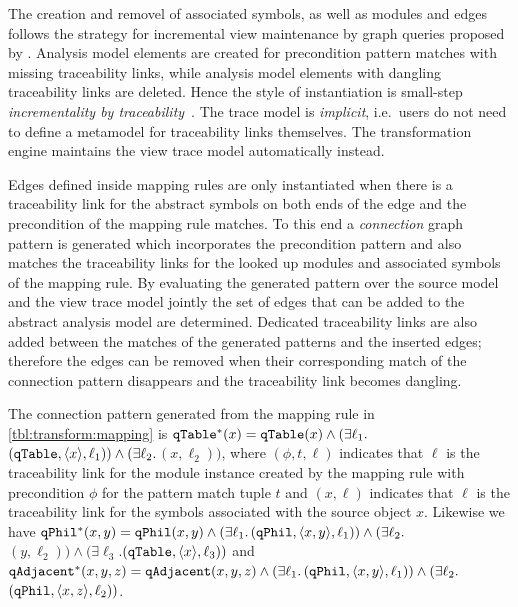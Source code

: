The creation and removel of associated symbols, as well as  modules and edges follows the strategy for incremental view maintenance by graph queries proposed by \citet{Debreceni14viewmodel}. Analysis model elements are created for precondition pattern matches with missing traceability links, while analysis model elements with dangling traceability links are deleted. Hence the style of instantiation is small-step \emph{incrementality by traceability}~\citep{Varro15styles}. The trace model is \emph{implicit}, i.e.~users do not need to define a metamodel for traceability links themselves. The transformation engine maintains the view trace model automatically instead.

Edges defined inside mapping rules are only instantiated when there is a traceability link for the abstract  symbols on both ends of the edge and the precondition of the mapping rule matches. To this end a \emph{connection} graph pattern is generated which incorporates the precondition pattern and  also matches the traceability links for the looked up  modules and associated symbols of the mapping rule. By evaluating the generated pattern over the source model and the view trace model jointly the set of edges that can be added to the abstract analysis model are determined. Dedicated traceability links are also added between the matches of the generated patterns and the inserted edges; therefore the edges can be removed when their corresponding match of the connection pattern disappears and the traceability link becomes dangling.

\begin{runningExample}
  The connection pattern generated from the mapping rule  in \vref{tbl:transform:mapping} is \(\texttt{\upshape qTable}^*(x) = \texttt{\upshape qTable}(x) \land (\exists \ell_1 .\)\((\texttt{\upshape qTable}, \langle x \rangle, \ell_1)) \land (\exists \ell_2 .\)\((x, \ell_2))\), where \((\phi, t, \ell)\) indicates that \(\ell\) is the traceability link for the  module instance created by the mapping rule with precondition \(\phi\) for the pattern match tuple \(t\) and \((x, \ell)\) indicates that \(\ell\) is the traceability link for the symbols associated with the source object \(x\). Likewise we have \(\texttt{\upshape qPhil}^*(x, y) = \texttt{\upshape qPhil}(x, y) \land (\exists \ell_1 .\)\((\texttt{\upshape qPhil}, \langle x, y \rangle, \ell_1)) \land (\exists \ell_2 .\)\((y, \ell_2)) \land (\exists \ell_3 .\)\((\texttt{\upshape qTable}, \langle x \rangle, \ell_3))\) and \(\texttt{\upshape qAdjacent}^*(x, y, z) = \texttt{\upshape qAdjacent}(x, y, z) \land (\exists \ell_1 .\)\((\texttt{\upshape qPhil}, \langle x, y \rangle, \ell_1)) \land (\exists \ell_2 .\)\((\texttt{\upshape qPhil}, \langle x, z \rangle, \ell_2))\).
\end{runningExample}

